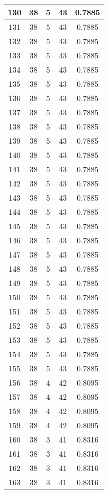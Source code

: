 \documentclass[letterpaper, 12pt]{article}
\begin{document}
\begin{longtable}{|c|c|c|c|c|}
\hline
130 & 38 & 5 & 43 & 0.7885 \\
\hline
131 & 38 & 5 & 43 & 0.7885 \\
\hline
132 & 38 & 5 & 43 & 0.7885 \\
\hline
133 & 38 & 5 & 43 & 0.7885 \\
\hline
134 & 38 & 5 & 43 & 0.7885 \\
\hline
135 & 38 & 5 & 43 & 0.7885 \\
\hline
136 & 38 & 5 & 43 & 0.7885 \\
\hline
137 & 38 & 5 & 43 & 0.7885 \\
\hline
138 & 38 & 5 & 43 & 0.7885 \\
\hline
139 & 38 & 5 & 43 & 0.7885 \\
\hline
140 & 38 & 5 & 43 & 0.7885 \\
\hline
141 & 38 & 5 & 43 & 0.7885 \\
\hline
142 & 38 & 5 & 43 & 0.7885 \\
\hline
143 & 38 & 5 & 43 & 0.7885 \\
\hline
144 & 38 & 5 & 43 & 0.7885 \\
\hline
145 & 38 & 5 & 43 & 0.7885 \\
\hline
146 & 38 & 5 & 43 & 0.7885 \\
\hline
147 & 38 & 5 & 43 & 0.7885 \\
\hline
148 & 38 & 5 & 43 & 0.7885 \\
\hline
149 & 38 & 5 & 43 & 0.7885 \\
\hline
150 & 38 & 5 & 43 & 0.7885 \\
\hline
151 & 38 & 5 & 43 & 0.7885 \\
\hline
152 & 38 & 5 & 43 & 0.7885 \\
\hline
153 & 38 & 5 & 43 & 0.7885 \\
\hline
154 & 38 & 5 & 43 & 0.7885 \\
\hline
155 & 38 & 5 & 43 & 0.7885 \\
\hline
156 & 38 & 4 & 42 & 0.8095 \\
\hline
157 & 38 & 4 & 42 & 0.8095 \\
\hline
158 & 38 & 4 & 42 & 0.8095 \\
\hline
159 & 38 & 4 & 42 & 0.8095 \\
\hline
160 & 38 & 3 & 41 & 0.8316 \\
\hline
161 & 38 & 3 & 41 & 0.8316 \\
\hline
162 & 38 & 3 & 41 & 0.8316 \\
\hline
163 & 38 & 3 & 41 & 0.8316 \\

\end{longtable}
\end{document}
